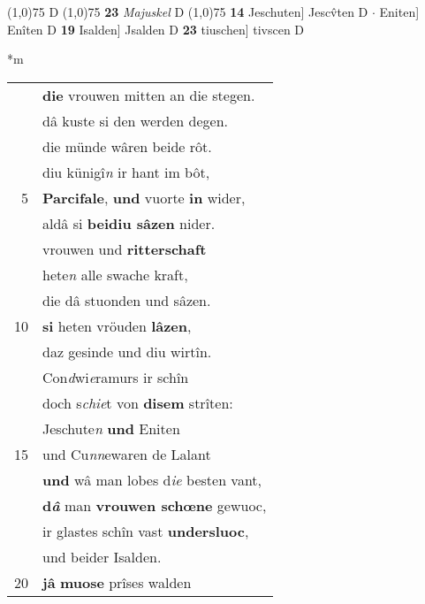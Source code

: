 \documentclass[8pt,a4paper,notitlepage]{article}
\begin{document}
\begin{table}[ht]
\begin{minipage}[t]{0.5\linewidth}
\begin{tabular}{rl}
\end{tabular}
\scriptsize
\line(1,0){75} \newline
D \newline
\line(1,0){75} \newline
\textbf{23} \textit{Majuskel} D  \newline
\line(1,0){75} \newline
\textbf{14} Jeschuten] Jescv̂ten D  $\cdot$ Eniten] Enîten D \textbf{19} Isalden] Jsalden D \textbf{23} tiuschen] tivscen D \newline
\end{minipage}
\hspace{0.5cm}
\begin{minipage}[t]{0.5\linewidth}
\small
\begin{center}*m
\end{center}
\begin{tabular}{rl}
 & \textbf{die} vrouwen mitten an die stegen.\\ 
 & dâ kuste si den werden degen.\\ 
 & die münde wâren beide rôt.\\ 
 & diu künigî\textit{n} ir hant im bôt,\\ 
5 & \textbf{Parcifale}, \textbf{und} vuorte \textbf{in} wider,\\ 
 & aldâ si \textbf{beidiu sâzen} nider.\\ 
 & vrouwen und \textbf{ritterschaft}\\ 
 & hete\textit{n} alle swache kraft,\\ 
 & die dâ stuonden und sâzen.\\ 
10 & \textbf{si} heten vröuden \textbf{lâzen},\\ 
 & daz gesinde und diu wirtîn.\\ 
 & Con\textit{d}wi\textit{e}ramurs ir schîn\\ 
 & doch s\textit{chie}t von \textbf{disem} strîten:\\ 
 & Jeschute\textit{n} \textbf{und} Eniten\\ 
15 & und Cu\textit{nn}ewaren de Lalant\\ 
 & \textbf{und} wâ man lobes d\textit{ie} besten vant,\\ 
 & \textbf{d\textit{â}} man \textbf{vrouwen schœne} gewuoc,\\ 
 & ir glastes schîn vast \textbf{undersluoc},\\ 
 & und beider Isalden.\\ 
20 & \textbf{jâ} \textbf{muose} prîses walden\\ 

\end{tabular}
\end{minipage}
\end{table}
\end{document}
